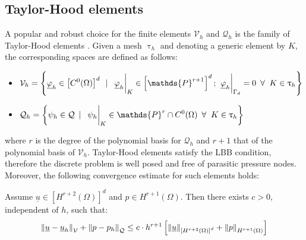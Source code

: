 \documentclass[11pt,a4paper]{article}
\renewcommand{\vec}[1]{\underline{#1}} %
\let\oldforall\forall
\renewcommand{\forall}{\oldforall \; }
\begin{document}
\subsection{Taylor-Hood elements}
A popular and robust choice for the finite elements $\mathcal{V}_{h}$ and $\mathcal{Q}_{h}$ is the family of Taylor-Hood elements \cite{elman_silvester_wathen_2014}. Given a mesh $\uptau_{h}$ and denoting a generic element by $K$, the corresponding spaces are defined as follows: 
\begin{itemize}
    \item $\displaystyle \mathcal{V}_{h} = \left\{ \vec{\varphi}_{h} \in \left[C^{0}(\Omega) \right]^{d} \enspace | \enspace \eval{\vec{\varphi}_{h}}_{K} \in \left[ \mathds{P}^{r+1}\right]^{d}; \; \eval{\vec{\varphi}_{h}}_{\Gamma_{d}} = 0 \enspace \forall K \in \uptau_{h}  \right\}$
    \item $\mathcal{Q}_{h} = \displaystyle \left\{\psi_{h} \in \mathcal{Q} \enspace | \enspace \eval{\psi_{h}}_{K} \in \mathds{P}^{r} \cap C^{0}(\Omega) \enspace \forall K \in \uptau_{h} \right\}$
\end{itemize}
where $r$ is the degree of the polynomial basis for $\mathcal{Q}_{h}$ and $r+1$ that of the polynomial basis of $\mathcal{V}_{h}$.
Taylor-Hood elements satisfy the LBB condition, therefore the discrete problem is well posed and free of parasitic pressure nodes. Moreover, the following convergence estimate for such elements holds: 
\begin{theorem}
    Assume $\vec{u} \in \left[ H^{r + 2} (\Omega) \right]^{d}$ and $p \in H^{r + 1}(\Omega)$. Then there exists $c > 0$, independent of $h$, such that: 
    \begin{equation*}
        \norm{\vec{u} - \vec{u}_{h}}_{\mathcal{V}} + \norm{p - p_{h}}_{\mathcal{Q}} \leq c \cdot h^{r + 1} \left[ \norm{\vec{u}}_{\left[ H^{r + 2} (\Omega) \right]^{d}} + \norm{p}_{H^{r + 1}(\Omega)} \right]
    \end{equation*}
\end{theorem}
\end{document}
